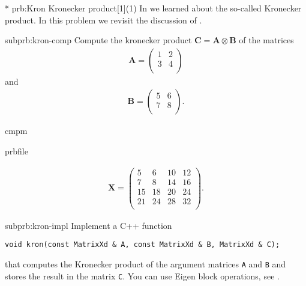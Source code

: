 \renewcommand{\ProblemName}{Kronecker}

\begin{samproblem}*
  {prb:Kron}
  {Kronecker product}[1](1)
  {
    In  we learned about the so-called Kronecker product.
    In this problem we revisit the
    discussion of .
  }

\begin{subproblem}{subprb:kron-comp}
  Compute the kronecker product
  $\mathbf{C} = \mathbf{A} \otimes \mathbf{B}$ of the matrices
\begin{align*}
  \mathbf{A} = \begin{pmatrix}
         1 & 2   \\
         3 & 4   \\
       \end{pmatrix}
\end{align*}
and
\begin{align*}
\mathbf{B}=\begin{pmatrix}
         5 & 6   \\
         7 & 8   \\
       \end{pmatrix}.
\end{align*}

\begin{samwriteprbpart}{cmpm}
  \begin{writeverbatim}{prbfile}
    \begin{samsolution}
      \begin{align*}
\mathbf{X}=\begin{pmatrix}
         5 & 6 & 10 & 12  \\
         7 & 8 & 14 & 16  \\
         15 & 18 & 20 & 24  \\
         21 & 24 & 28 & 32  \\
       \end{pmatrix}.
        \end{align*}
      \end{samsolution}
    \end{writeverbatim}
  \end{samwriteprbpart}
\end{subproblem}

\begin{subproblem}{subprb:kron-impl}
Implement a C++ function
\begin{lstlisting}[style=cppsimple]
void kron(const MatrixXd & A, const MatrixXd & B, MatrixXd & C);
\end{lstlisting}
that computes the Kronecker product of the argument matrices
\texttt{A} and \texttt{B} and stores the result in the matrix \texttt{C}.
You can use Eigen block operations, see .


\end{subproblem}
\end{samproblem}
